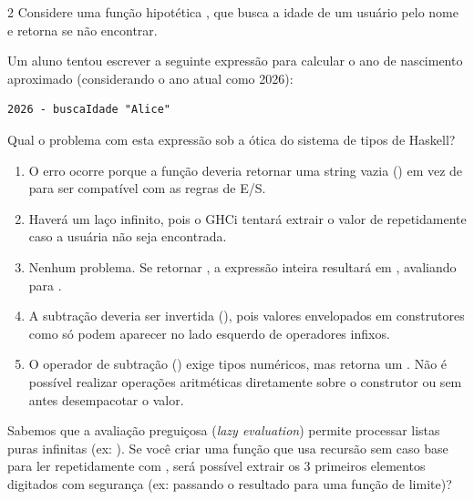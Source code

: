 \documentclass[a4paper,10pt,brazil]{article}
\begin{document}
\begin{multicols}{2}
Considere uma função hipotética , que busca a idade de um usuário pelo nome e retorna  se não encontrar. 

Um aluno tentou escrever a seguinte expressão para calcular o ano de nascimento aproximado (considerando o ano atual como 2026):
\begin{verbatim}
2026 - buscaIdade "Alice"
\end{verbatim}

Qual o problema com esta expressão sob a ótica do sistema de tipos de Haskell?

\begin{enumerate}
  \item O erro ocorre porque a função  deveria retornar uma string vazia () em vez de  para ser compatível com as regras de E/S.

  \item Haverá um laço infinito, pois o GHCi tentará extrair o valor de  repetidamente caso a usuária não seja encontrada.

  \item Nenhum problema. Se  retornar , a expressão inteira resultará em , avaliando para .

  \item A subtração deveria ser invertida (), pois valores envelopados em construtores como  só podem aparecer no lado esquerdo de operadores infixos.

  \item O operador de subtração (\haskellinline{-}) exige tipos numéricos, mas  retorna um . Não é possível realizar operações aritméticas diretamente sobre o construtor  ou  sem antes desempacotar o valor.


\end{enumerate}

Sabemos que a avaliação preguiçosa (\emph{lazy evaluation}) permite processar listas puras infinitas (ex: ). 
Se você criar uma função  que usa recursão sem caso base para ler repetidamente com , será possível extrair os 3 primeiros elementos digitados com segurança (ex: passando o resultado para uma função de limite)?


\end{multicols}
\end{document}
